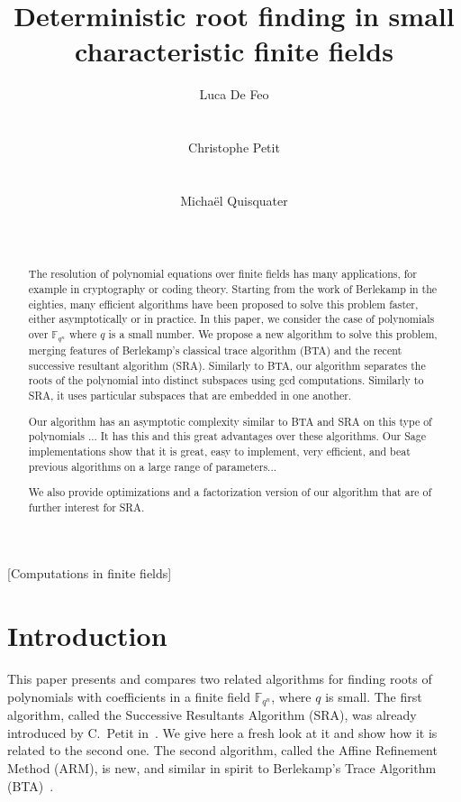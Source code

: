 \documentclass{sig-alternate}
\author{
  \alignauthor Luca De Feo\\
  \affaddr{Laboratoire PRiSM}\\
  \affaddr{Universit\'e de Versailles}\\
  \email{luca.de-feo@uvsq.fr}
  \alignauthor Christophe Petit\\
  \affaddr{Crypto Group}\\
  \affaddr{University College London}\\
  \email{}
  \alignauthor Micha\"el Quisquater\\
  \affaddr{Laboratoire PRiSM}\\
  \affaddr{Universit\'e de Versailles}\\
  \email{mquis@prism.uvsq.fr}
}
\title{Deterministic root finding in small characteristic finite
  fields}
\newcommand{\ff}[1]{\mathbb{F}_{#1}}
\newcommand{\fqn}{\ff{q^n}}
\newcommand{\qq}{q}
\newcommand{\nn}{n}
\newcommand{\qn}{{\qq^\nn}}
\newcommand{\extf}{\ff{\qn}}
\newcounter{algo}
\begin{document}
\maketitle
\begin{abstract}
  The resolution of polynomial equations over finite fields has many
  applications, for example in cryptography or coding theory. Starting
  from the work of Berlekamp in the eighties, many efficient
  algorithms have been proposed to solve this problem faster, either
  asymptotically or in practice.  In this paper, we consider the case
  of polynomials over $\fqn$ where $\qq$ is a small number. We propose a
  new algorithm to solve this problem, merging features of Berlekamp's
  classical trace algorithm (BTA) and the recent successive resultant
  algorithm (SRA).  Similarly to BTA, our algorithm separates the
  roots of the polynomial into distinct subspaces using gcd
  computations. Similarly to SRA, it uses particular subspaces that
  are embedded in one another.

  Our algorithm has an asymptotic complexity similar to BTA and SRA on
  this type of polynomials ... It has this and this great advantages
  over these algorithms. Our Sage implementations show that it is
  great, easy to implement, very efficient, and beat previous
  algorithms on a large range of parameters...

  We also provide optimizations and a factorization version of our
  algorithm that are of further interest for SRA.
\end{abstract}

[Computations in finite fields]


\section{Introduction}




This paper presents and compares two related algorithms for finding
roots of polynomials with coefficients in a finite field $\extf$,
where $\qq$ is small. The first algorithm, called the Successive
Resultants Algorithm (SRA), was already introduced by C.~Petit
in~\cite{cgUCL-P14}. We give here a fresh look at it and show how it
is related to the second one. The second algorithm, called the Affine
Refinement Method (ARM), is new, and similar in spirit to Berlekamp's
Trace Algorithm (BTA)~\cite{berl70}.
\end{document}
